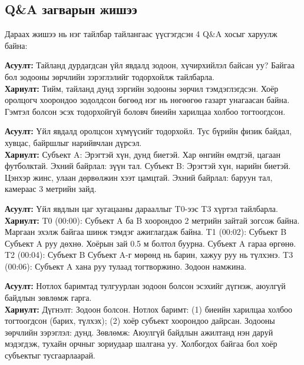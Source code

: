 \subsection{Q\&A загварын жишээ}

Дараах жишээ нь нэг тайлбар тайлангаас үүсгэгдсэн 4 Q\&A хосыг харуулж байна:

\begin{tcolorbox}[tab2, title={Q\&A Жишээ --- event\_type}]
\small
\textbf{Асуулт:} Тайланд дурдагдсан үйл явдалд зодоон, хүчирхийлэл байсан уу? Байгаа бол зодооны зөрчлийн зэрэглэлийг тодорхойлж тайлбарла.\\[4pt]
\textbf{Хариулт:} Тийм, тайланд дунд зэргийн зодооны зөрчил тэмдэглэгдсэн. Хоёр оролцогч хоорондоо зодолдсон бөгөөд нэг нь нөгөөгөө газарт унагаасан байна. Гэмтэл болсон эсэх тодорхойгүй боловч биеийн харилцаа холбоо тогтоогдсон.
\end{tcolorbox}

\begin{tcolorbox}[tab2, title={Q\&A Жишээ --- subjects}]
\small
\textbf{Асуулт:} Үйл явдалд оролцсон хүмүүсийг тодорхойл. Тус бүрийн физик байдал, хувцас, байршлыг нарийвчлан дүрсэл.\\[4pt]
\textbf{Хариулт:} Субъект A: Эрэгтэй хүн, дунд биетэй. Хар өнгийн өмдтэй, цагаан футболктай. Эхний байрлал: зүүн тал. Субъект B: Эрэгтэй хүн, нарийн биетэй. Цэнхэр жинс, улаан дөрвөлжин хээт цамцтай. Эхний байрлал: баруун тал, камераас 3 метрийн зайд.
\end{tcolorbox}

\begin{tcolorbox}[tab2, title={Q\&A Жишээ --- chronology}]
\small
\textbf{Асуулт:} Үйл явдлын цаг хугацааны дарааллыг T0-ээс T3 хүртэл тайлбарла.\\[4pt]
\textbf{Хариулт:} T0 (00:00): Субъект A ба B хоорондоо 2 метрийн зайтай зогсож байна. Маргаан эхэлж байгаа шинж тэмдэг ажиглагдаж байна. T1 (00:02): Субъект B Субъект A руу дөхнө. Хоёрын зай 0.5 м болтол буурна. Субъект A гараа өргөнө. T2 (00:04): Субъект B Субъект A-г мөрөнд нь барин, хажуу руу нь түлхэнэ. T3 (00:06): Субъект A хана руу тулаад тогтворжино. Зодоон намжина.
\end{tcolorbox}

\begin{tcolorbox}[tab2, title={Q\&A Жишээ --- conclusion}]
\small
\textbf{Асуулт:} Нотлох баримтад тулгуурлан зодоон болсон эсэхийг дүгнэж, аюулгүй байдлын зөвлөмж гарга.\\[4pt]
\textbf{Хариулт:} Дүгнэлт: Зодоон болсон. Нотлох баримт: (1) биеийн харилцаа холбоо тогтоогдсон (барих, түлхэх); (2) хоёр субъект хоорондоо дайрсан. Зодооны зөрчлийн зэрэглэл: дунд. Зөвлөмж: Аюулгүй байдлын ажилтанд нэн даруй мэдэгдэж, тухайн орчныг зориудаар шалгана уу. Холбогдох байгаа бол хоёр субъектыг тусгаарлаарай.
\end{tcolorbox}

